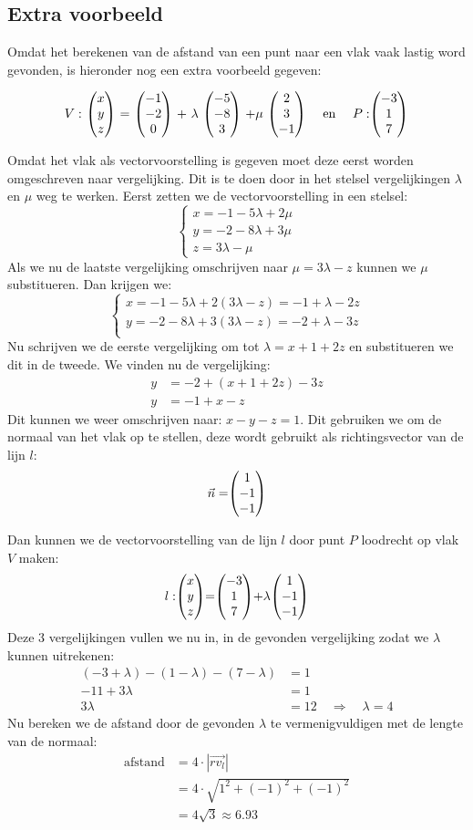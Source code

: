 \subsection{Extra voorbeeld}
Omdat het berekenen van de afstand van een punt naar een vlak vaak lastig word gevonden, is hieronder nog een extra voorbeeld gegeven:

\[V:\ \vecdrie{x}{y}{z} \ =\ \vecdrie{-1}{-2}{0} \ +\ \lambda\ \vecdrie{-5}{-8}{3} \ + \mu\ \vecdrie{2}{3}{-1} \quad \text{ en } \quad P: \vecdrie{-3}{1}{7}\]

Omdat het vlak als vectorvoorstelling is gegeven moet deze eerst worden om\-geschreven naar vergelijking. Dit is te doen door in het stelsel vergelijkingen $\lambda$ en $\mu$ weg te werken.
Eerst zetten we de vectorvoorstelling in een stelsel:
\[\begin{cases}
x = -1 -5\lambda + 2\mu\\
y = -2 - 8\lambda + 3\mu\\
z = 3\lambda - \mu  
\end{cases}
\] 
Als we nu de laatste vergelijking omschrijven naar $\mu = 3\lambda-z$ kunnen we $\mu$ substitueren. Dan krijgen we:
\[\begin{cases}
x = -1 -5\lambda + 2(3\lambda-z) = -1 + \lambda -2z\\
y = -2 - 8\lambda + 3(3\lambda-z) = -2 + \lambda - 3z\\
\end{cases}
\] 
Nu schrijven we de eerste vergelijking om tot $\lambda = x + 1 + 2z$ en substitueren we dit in de tweede. We vinden nu de vergelijking: 
\begin{align*}
    y &= -2+(x+1+2z) -3z \\
    y &= -1 + x - z
\end{align*}
Dit kunnen we weer omschrijven naar: $x-y-z=1$. Dit gebruiken we om de normaal van het vlak op te stellen, deze wordt gebruikt als richtingsvector van de lijn $l$: 
\[\vec{n} = \vecdrie{1}{-1}{-1} \]
    
Dan kunnen we de vectorvoorstelling van de lijn $l$ door punt $P$ loodrecht op vlak $V$ maken: 
\[l: \vecdrie{x}{y}{z} = \vecdrie{-3}{1}{7} + \lambda \vecdrie{1}{-1}{-1} \]
Deze 3 vergelijkingen vullen we nu in, in de gevonden vergelijking zodat we $\lambda$ kunnen uitrekenen:
\begin{align*}
    (-3 + \lambda) - (1-\lambda) - (7-\lambda) &= 1 \\
    -11 + 3\lambda &= 1 \\
    3\lambda &= 12 \quad \Rightarrow \quad \lambda = 4
\end{align*}
Nu bereken we de afstand door de gevonden $\lambda$ te vermenigvuldigen met de lengte van de normaal: 
\begin{align*}
    \text{afstand} &= 4\cdot |\overrightarrow{rv_{l}}| \\
    &= 4\cdot \sqrt{1^{2} + (-1)^{2} + (-1)^{2} } \\
    &= 4\sqrt{3} \approx 6.93
\end{align*}

